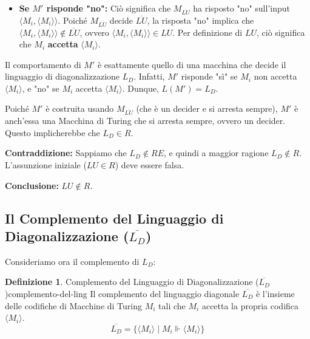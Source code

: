 \documentclass[a4paper]{article}
\makeatletter
\theoremstyle{definition} %
\newtheorem{definition}{Definizione}[section] %
\renewenvironment{proof}[1][\proofname]{\par
  \pushQED{\qed}%
  \normalfont \topsep6\p@\@plus6\p@\relax
  \trivlist
  \item[\hskip\labelsep
        \bfseries
    #1\@addpunct{.}]\ignorespaces
}{%
  \popQED\endtrivlist\@endpefalse
}
\makeatother
\begin{document}
\begin{proof}
\begin{itemize}
    Poiché $M_{\overline{LU}}$ decide $\overline{LU}$, la risposta "sì" implica che $\langle M_i, \langle M_i \rangle \rangle \in \overline{LU}$.
    Per definizione di $\overline{LU}$, ciò significa che $M_i$ \textbf{non accetta} $\langle M_i \rangle$.
    \item \textbf{Se $M'$ risponde "no":}
    Ciò significa che $M_{\overline{LU}}$ ha risposto "no" sull'input $\langle M_i, \langle M_i \rangle \rangle$.
    Poiché $M_{\overline{LU}}$ decide $\overline{LU}$, la risposta "no" implica che $\langle M_i, \langle M_i \rangle \rangle \notin \overline{LU}$, ovvero $\langle M_i, \langle M_i \rangle \rangle \in LU$.
    Per definizione di $LU$, ciò significa che $M_i$ \textbf{accetta} $\langle M_i \rangle$.
\end{itemize}
Il comportamento di $M'$ è esattamente quello di una macchina che decide il linguaggio di diagonalizzazione $L_D$. Infatti, $M'$ risponde "sì" se $M_i$ non accetta $\langle M_i \rangle$, e "no" se $M_i$ accetta $\langle M_i \rangle$. Dunque, $L(M') = L_D$.

Poiché $M'$ è costruita usando $M_{\overline{LU}}$ (che è un decider e si arresta sempre), $M'$ è anch'essa una Macchina di Turing che si arresta sempre, ovvero un decider. Questo implicherebbe che $L_D \in R$.

\textbf{Contraddizione:} Sappiamo che $L_D \notin RE$, e quindi a maggior ragione $L_D \notin R$.
L'assunzione iniziale ($LU \in R$) deve essere falsa.

\textbf{Conclusione:} $LU \notin R$.
\end{proof}

\subsection{Il Complemento del Linguaggio di Diagonalizzazione ($\overline{L_D}$)}
Consideriamo ora il complemento di $L_D$:
\begin{definition}{Complemento del Linguaggio di Diagonalizzazione ($\overline{L_D}$)}{complemento-del-ling}
Il complemento del linguaggio diagonale $\overline{L_D}$ è l'insieme delle codifiche di Macchine di Turing $M_i$ tali che $M_i$ accetta la propria codifica $\langle M_i \rangle$.
\[ \overline{L_D} = \{ \langle M_i \rangle \mid M_i \Vdash \langle M_i \rangle \} \]
\end{definition}
\end{document}
